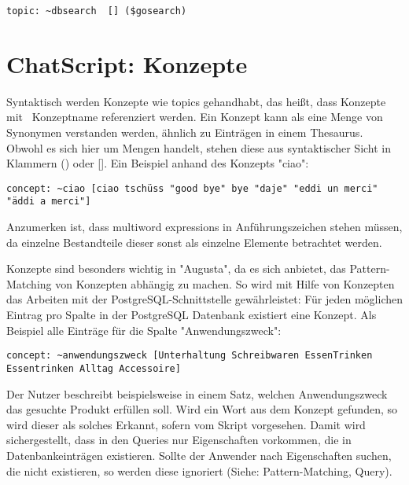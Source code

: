 \begin{lstlisting}[caption={Topicbezeichner in dbsearch.top}]
topic: ~dbsearch  [] ($gosearch)
\end{lstlisting}

\section{ChatScript: Konzepte}
\label{sec:ChatScript: Konzepte}

Syntaktisch werden Konzepte wie topics gehandhabt, das heißt, dass Konzepte mit ~Konzeptname referenziert werden. Ein Konzept kann als eine Menge von Synonymen verstanden werden, ähnlich zu Einträgen in einem Thesaurus. Obwohl es sich hier um Mengen handelt, stehen diese aus syntaktischer Sicht in Klammern () oder []. Ein Beispiel anhand des Konzepts "ciao":

\begin{lstlisting}[caption={Konzept 'ciao' aus konzepte.top}]
concept: ~ciao [ciao tschüss "good bye" bye "daje" "eddi un merci" "äddi a merci"]
\end{lstlisting}

Anzumerken ist, dass multiword expressions in Anführungszeichen stehen müssen, da einzelne Bestandteile dieser sonst als einzelne Elemente betrachtet werden.

Konzepte sind besonders wichtig in "Augusta", da es sich anbietet, das Pattern-Matching von Konzepten abhängig zu machen. So wird mit Hilfe von Konzepten das Arbeiten mit der PostgreSQL-Schnittstelle gewährleistet: Für jeden möglichen Eintrag pro Spalte in der PostgreSQL Datenbank existiert eine Konzept. Als Beispiel alle Einträge für die Spalte "Anwendungszweck":  

\begin{lstlisting}[caption={Konzept 'anwendungszweck' aus konzepte.top}]
concept: ~anwendungszweck [Unterhaltung Schreibwaren EssenTrinken Essentrinken Alltag Accessoire]
\end{lstlisting}

Der Nutzer beschreibt beispielsweise in einem Satz, welchen Anwendungszweck das gesuchte Produkt erfüllen soll. Wird ein Wort aus dem Konzept gefunden, so wird dieser als solches Erkannt, sofern vom Skript vorgesehen. Damit wird sichergestellt, dass in den Queries nur Eigenschaften vorkommen, die in Datenbankeinträgen existieren. Sollte der Anwender nach Eigenschaften suchen, die nicht existieren, so werden diese ignoriert (Siehe: Pattern-Matching, Query). 

